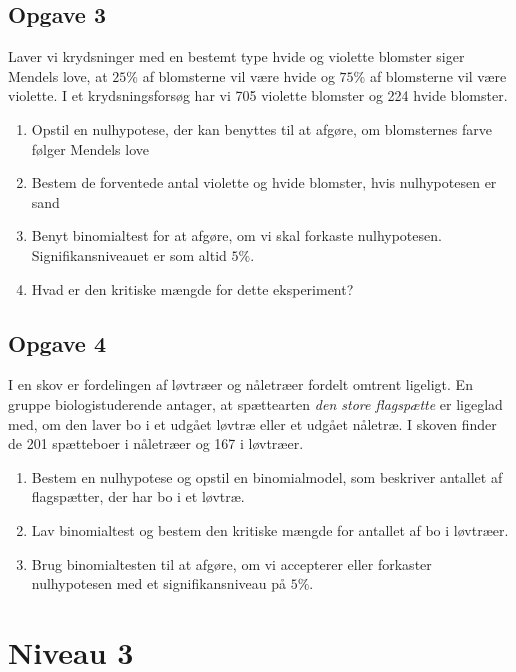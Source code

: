 \subsection*{Opgave 3}
Laver vi krydsninger med en bestemt type hvide og violette blomster siger Mendels love, at $25\%$ af blomsterne vil være hvide og $75\%$ af blomsterne vil være violette. I et krydsningsforsøg har vi 705 violette blomster og 224 hvide blomster. 
\begin{enumerate}[label=\roman*)]
\item Opstil en nulhypotese, der kan benyttes til at afgøre, om blomsternes farve følger Mendels love
\item Bestem de forventede antal violette og hvide blomster, hvis nulhypotesen er sand
\item Benyt binomialtest for at afgøre, om vi skal forkaste nulhypotesen. Signifikansniveauet er som altid $5\%$.
\item Hvad er den kritiske mængde for dette eksperiment?
\end{enumerate}

\subsection*{Opgave 4}
I en skov er fordelingen af løvtræer og nåletræer fordelt omtrent ligeligt. En gruppe biologistuderende antager, at spættearten \textit{den store flagspætte} er ligeglad med, om den laver bo i et udgået løvtræ eller et udgået nåletræ. I skoven finder de 201 spætteboer i nåletræer og 167 i løvtræer. 
\begin{enumerate}[label=\roman*)]
\item Bestem en nulhypotese og opstil en binomialmodel, som beskriver antallet af flagspætter, der har bo i et løvtræ.
\item Lav binomialtest og bestem den kritiske mængde for antallet af bo i løvtræer.
\item Brug binomialtesten til at afgøre, om vi accepterer eller forkaster nulhypotesen med et signifikansniveau på $5\%$.

\end{enumerate}

\section*{Niveau 3}

